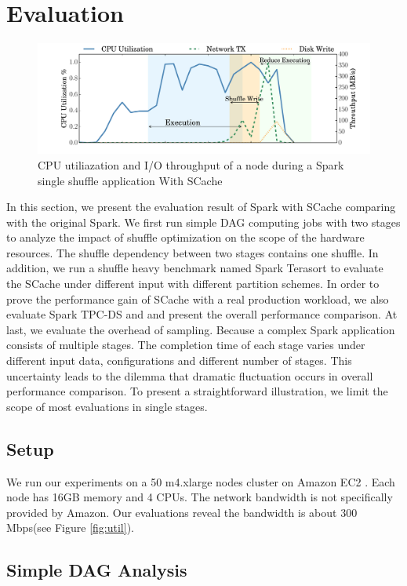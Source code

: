 \section{Evaluation}\label{evaluation}
\begin{figure}
	\includegraphics[width=\linewidth]{fig/scache_util}
	\caption{CPU utiliazation and I/O throughput of a node during a Spark single shuffle application With SCache}
	\label{fig:scache_util}
\end{figure}
In this section, we present the evaluation result of Spark with SCache comparing with the original Spark. 
We first run simple DAG computing jobs with two stages to analyze the impact of shuffle optimization on the scope of the hardware resources. 
The shuffle dependency between two stages contains one shuffle. 
In addition, we run a shuffle heavy benchmark named Spark Terasort \cite{spark-tera} to evaluate the SCache under different input with different partition schemes. 
In order to prove the performance gain of SCache with a real production workload, we also evaluate Spark TPC-DS \cite{sparktpcds} and and present the overall performance comparison. 
At last, we evaluate the overhead of sampling. Because a complex Spark application consists of multiple stages. The completion time of each stage varies under different input data, configurations and different number of stages. This uncertainty leads to the dilemma that dramatic fluctuation occurs in overall performance comparison. To present a straightforward illustration, we limit the scope of most evaluations in single stages. 
\subsection{Setup}\label{stepup}
We run our experiments on a 50 m4.xlarge nodes cluster on Amazon EC2 \cite{aws}. Each node has 16GB memory and 4 CPUs. The network bandwidth is not specifically provided by Amazon. Our evaluations reveal the bandwidth is about 300 Mbps(see Figure \ref{fig:util}).

\subsection{Simple DAG Analysis}
